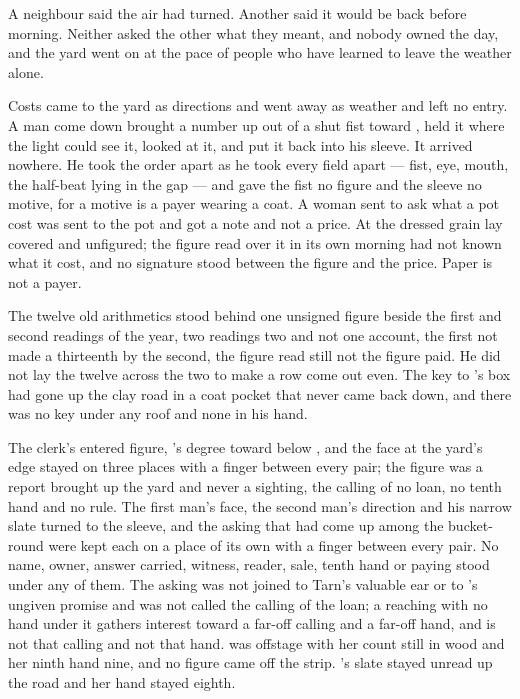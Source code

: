 A neighbour said the air had turned. Another said it would be back before morning. Neither asked the other what they meant, and nobody owned the day, and the yard went on at the pace of people who have learned to leave the weather alone.

\scenebreak

Costs came to the yard as directions and went away as weather and left no entry. A man come down  brought a number up out of a shut fist toward , held it where the light could see it, looked at it, and put it back into his sleeve. It arrived nowhere. He took the order apart as he took every field apart --- fist, eye, mouth, the half-beat lying in the gap --- and gave the fist no figure and the sleeve no motive, for a motive is a payer wearing a coat. A woman sent to ask what a pot cost was sent to the pot and got a note and not a price. At  the dressed grain lay covered and unfigured; the figure read over it in its own morning had not known what it cost, and no signature stood between the figure and the price. Paper is not a payer.

The twelve old arithmetics stood behind one unsigned figure beside the first and second readings of the year, two readings two and not one account, the first not made a thirteenth by the second, the figure read still not the figure paid. He did not lay the twelve across the two to make a row come out even. The key to 's box had gone up the clay road in a coat pocket that never came back down, and there was no key under any roof and none in his hand.

The clerk's entered figure, 's degree toward  below , and the face at the yard's edge stayed on three places with a finger between every pair; the figure was a report brought up the yard and never a sighting, the calling of no loan, no tenth hand and no rule. The first man's face, the second man's direction and his narrow slate turned to the sleeve, and the asking that had come up among the bucket-round were kept each on a place of its own with a finger between every pair. No name, owner, answer carried, witness, reader, sale, tenth hand or paying stood under any of them. The asking was not joined to Tarn's valuable ear or to 's ungiven promise and was not called the calling of the loan; a reaching with no hand under it gathers interest toward a far-off calling and a far-off hand, and is not that calling and not that hand.  was offstage with her count still in wood and her ninth hand nine, and no figure came off the strip. 's slate stayed unread up the road and her hand stayed eighth.

